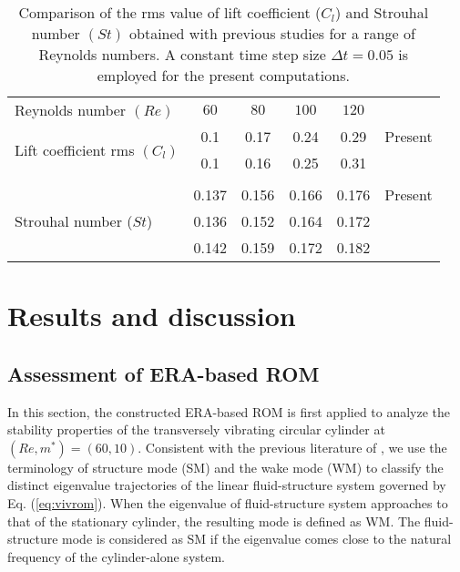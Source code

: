 \documentclass{jfm}
\begin{document}
\begin{table}
\begin{center}
\begin{tabular}{ l c c c c l }

Reynolds number $(Re)$   & $60$ & $80$ &  $100$ &  $120$   \\
\multirow{2}{*}{Lift coefficient rms $(C_l)$}  
& 0.1      & 0.17    &  0.24      & 0.29    & Present \\
& 0.1      & 0.16    &  0.25      & 0.31    & \cite{Zhang1995}\\
 \\
\multirow{3}{*}{Strouhal number ($St$)} 
& 0.137     & 0.156     &  0.166      & 0.176  & Present\\
& 0.136     & 0.152     &  0.164      & 0.172  & \cite{williamson1989} \\
& 0.142     & 0.159     &  0.172      & 0.182  & \cite{Zhang1995} 
\end{tabular}
\caption{Comparison of the rms value of lift coefficient ($C_l$) and Strouhal number $(St)$ obtained 
with previous studies for a range of Reynolds numbers. 
A constant time step size $\Delta t=0.05$ is employed for the present computations.}
\label{tab:cl_st}
\end{center}
\end{table}



\section{Results and discussion}\label{sec:VIV}


\subsection{Assessment of ERA-based ROM}\label{sec:ROM_val}

In this section,
the constructed ERA-based ROM is first applied to analyze the stability properties of the 
transversely vibrating circular cylinder at $(Re,m^*)=(60,10)$. 
Consistent with the previous literature of \cite{meliga2011,Zhang2015}, 
we use the terminology of structure mode (SM) and 
the wake mode (WM) to classify the distinct eigenvalue trajectories of the linear 
fluid-structure system governed by Eq. (\ref{eq:vivrom}).
%
When the eigenvalue of fluid-structure system approaches to that of the stationary 
cylinder, the resulting mode is defined as WM. The fluid-structure 
mode is considered as SM if the eigenvalue comes close to the natural frequency 
of the cylinder-alone system. 
\end{document}
